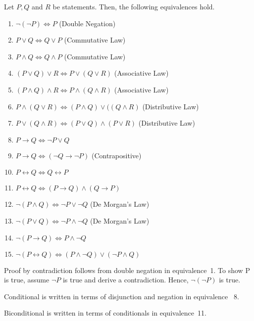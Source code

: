 \documentclass[]{article}
\begin{document}
\begin{thm}[Equivalences] Let $P,Q$ and $R$ be statements. Then, the following equivalences hold.
	\begin{enumerate}
		\item $\neg ( \neg P) \Leftrightarrow P$ (Double Negation) 
		\item $P \vee Q \Leftrightarrow Q \vee P$ (Commutative Law)
		\item $P \wedge Q \Leftrightarrow Q \wedge P$ (Commutative Law)
		\item $(P \vee Q) \vee R \Leftrightarrow P \vee (Q \vee R)$ (Associative Law)
		\item $(P \wedge Q) \wedge R \Leftrightarrow P \wedge (Q \wedge R)$ (Associative Law)
		\item $P \wedge (Q \vee R) \Leftrightarrow  (P \wedge Q) \vee ((Q \wedge R)$ (Distributive Law)
		\item $P \vee (Q \wedge R) \Leftrightarrow (P \vee Q) \wedge (P \vee R)$ (Distributive Law)
		\item $P \rightarrow Q \Leftrightarrow \neg P \vee Q$
		\item $P \rightarrow Q \Leftrightarrow ( \neg Q \rightarrow \neg P)$ (Contrapositive)
		\item $P \leftrightarrow Q \Leftrightarrow Q \leftrightarrow P$
		\item $P \leftrightarrow Q \Leftrightarrow (P \rightarrow Q) \wedge (Q \rightarrow P)$
		\item $\neg (P \wedge Q) \Leftrightarrow \neg P \vee \neg Q$ (De Morgan's Law)
		\item $\neg (P \vee Q) \Leftrightarrow \neg P \wedge \neg Q$ (De Morgan's Law)
		\item $\neg (P \rightarrow Q) \Leftrightarrow P \wedge \neg Q$
		\item $\neg (P \leftrightarrow Q) \Leftrightarrow (P \wedge \neg Q) \vee ( \neg P \wedge Q)$
	\end{enumerate}
\end{thm}
\begin{rem} Proof by contradiction follows from double negation in equivalence~1. To show P is true, assume  $\neg P$ is true and derive a contradiction. Hence, $\neg ( \neg P)$ is true.  
\end{rem}
\begin{rem} Conditional is written in terms of disjunction and negation in equivalence ~8. 
\end{rem}
\begin{rem} Biconditional is written in terms of conditionals in equivalence~11.
\end{rem}
		
\end{document}
